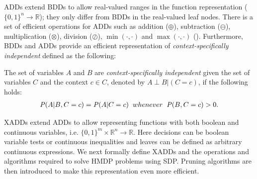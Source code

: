 \documentclass[twoside,11pt]{article}
\newenvironment{mydef}[1][Definition]{\begin{trivlist}
\item[\hskip \labelsep {\bfseries #1}]}{\end{trivlist}}
\begin{document}
ADDs extend BDDs to allow real-valued ranges in the function representation ($\lbrace 0,1\rbrace^n \rightarrow \mathbb{R}$); they only differ from BDDs in the real-valued leaf nodes. There is a set of efficient operations for ADDs such as addition
($\oplus$), subtraction ($\ominus$), multiplication ($\otimes$),
division ($\oslash$), $\min(\cdot,\cdot)$ and $\max(\cdot,\cdot)$ (\cite{bahar93add}). Furthermore, BDDs and ADDs provide an efficient representation of \emph{context-specifically independent} defined as the following: 
\begin{mydef}
The set of variables $A$ and $B$ are \emph{context-specifically independent} given the set of variables $C$ and the context $c \in C$, denoted by $A \perp B | (C=c)$, if the following holds: 
\begin{align}
\mathit{P}(A | B,C=c) = \mathit{P}(A|C=c) \hspace{2mm} whenever \hspace{2mm} \mathit{P}(B,C=c) >0. \label{def:csi}
\end{align}
\end{mydef}



XADDs extend ADDs to allow representing functions with both boolean and continuous variables, i.e. $\{0,1\}^{m} \times \mathbb{R}^n \rightarrow \mathbb{R}$. Here decisions can be boolean variable tests or continuous inequalities and leaves can be defined as arbitrary continuous expressions. We next formally define XADDs and the operations and algorithms required to solve HMDP problems using SDP. Pruning algorithms are then introduced to make this representation even more efficient. 
\end{document}
